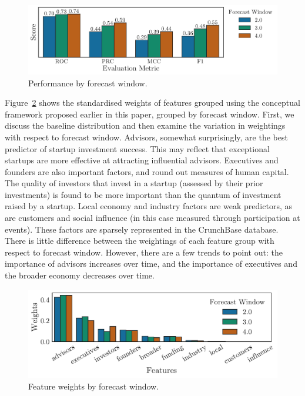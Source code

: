 \documentclass[../thesis/thesis.tex]{subfiles}
\begin{document}
\begin{figure}[!htb]
    \centering
    \includegraphics[width=\textwidth]{../figures/evaluation/performance_window}
    \caption[Performance by forecast window]{Performance by forecast window.}
    \label{fig:evaluation:performance_window}
\end{figure}

Figure~\ref{fig:evaluation:features_window} shows the standardised weights of features grouped using the conceptual framework proposed earlier in this paper, grouped by forecast window. First, we discuss the baseline distribution and then examine the variation in weightings with respect to forecast window. Advisors, somewhat surprisingly, are the best predictor of startup investment success. This may reflect that exceptional startups are more effective at attracting influential advisors. Executives and founders are also important factors, and round out measures of human capital. The quality of investors that invest in a startup (assessed by their prior investments) is found to be more important than the quantum of investment raised by a startup. Local economy and industry factors are weak predictors, as are customers and social influence (in this case measured through participation at events). These factors are sparsely represented in the CrunchBase database. There is little difference between the weightings of each feature group with respect to forecast window. However, there are a few trends to point out: the importance of advisors increases over time, and the importance of executives and the broader economy decreases over time.

\begin{figure}[!htb]
    \centering
    \includegraphics[width=\textwidth]{../figures/evaluation/features_window}
    \caption[Feature weights by forecast window]{Feature weights by forecast window.}
    \label{fig:evaluation:features_window}
\end{figure}
\end{document}
